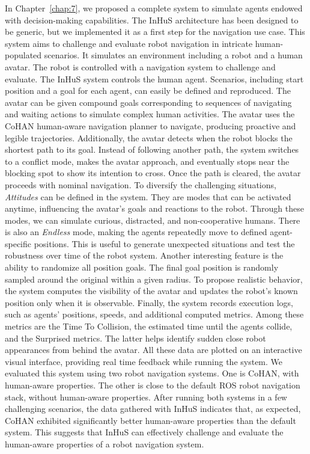 In Chapter~\ref{chap:7}, we proposed a complete system to simulate agents endowed with decision-making capabilities. The InHuS architecture has been designed to be generic, but we implemented it as a first step for the navigation use case. 
This system aims to challenge and evaluate robot navigation in intricate human-populated scenarios. It simulates an environment including a robot and a human avatar. The robot is controlled with a navigation system to challenge and evaluate. The InHuS system controls the human agent. Scenarios, including start position and a goal for each agent, can easily be defined and reproduced. The avatar can be given compound goals corresponding to sequences of navigating and waiting actions to simulate complex human activities. 
The avatar uses the CoHAN human-aware navigation planner to navigate, producing proactive and legible trajectories. 
Additionally, the avatar detects when the robot blocks the shortest path to its goal. Instead of following another path, the system switches to a conflict mode, makes the avatar approach, and eventually stops near the blocking spot to show its intention to cross. Once the path is cleared, the avatar proceeds with nominal navigation.
To diversify the challenging situations, \textit{Attitudes} can be defined in the system. They are modes that can be activated anytime, influencing the avatar's goals and reactions to the robot. Through these modes, we can simulate curious, distracted, and non-cooperative humans. There is also an \textit{Endless} mode, making the agents repeatedly move to defined agent-specific positions. This is useful to generate unexpected situations and test the robustness over time of the robot system. Another interesting feature is the ability to randomize all position goals. The final goal position is randomly sampled around the original within a given radius. 
To propose realistic behavior, the system computes the visibility of the avatar and updates the robot's known position only when it is observable. 
Finally, the system records execution logs, such as agents' positions, speeds, and additional computed metrics. Among these metrics are the Time To Collision, the estimated time until the agents collide, and the Surprised metrics. The latter helps identify sudden close robot appearances from behind the avatar. All these data are plotted on an interactive visual interface, providing real time feedback while running the system.
We evaluated this system using two robot navigation systems. One is CoHAN, with human-aware properties. The other is close to the default ROS robot navigation stack, without human-aware properties.
After running both systems in a few challenging scenarios, the data gathered with InHuS indicates that, as expected, CoHAN exhibited significantly better human-aware properties than the default system. This suggests that InHuS can effectively challenge and evaluate the human-aware properties of a robot navigation system. 

